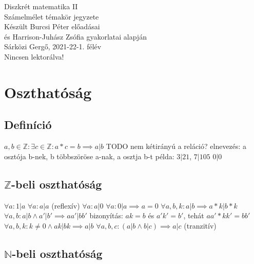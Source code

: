 \documentclass[12pt,a4paper]{article}
\begin{document}
\begin{center}
	\huge
	Diszkrét matematika II\\
	\vspace{1mm}
	\LARGE
	Számelmélet témakör jegyzete\\
	\vspace{5mm}
	\large
	Készült Burcsi Péter előadásai\\
	és Harrison-Juhász Zsófia gyakorlatai alapján\\
	\vspace{5mm}
	Sárközi Gergő, 2021-22-1. félév\\
	Nincsen lektorálva!
\end{center}

\tableofcontents

\pagebreak

\section{Oszthatóság}

\subsection{Definíció}

\begin{outline}
	\1 $a,b \in \mathbb{Z}: \exists c \in \mathbb{Z}: a*c=b \implies a|b$
		\2 TODO nem kétirányú a reláció?
	\1 elnevezés: a osztója b-nek, b többszöröse a-nak, a osztja b-t
	\1 példa: $3|21$, $7|105$
	\1 $0|0$
\end{outline}

\subsection{$\mathbb{Z}$-beli oszthatóság}

\begin{outline}
	\1 $\forall a: 1|a$
	\1 $\forall a: a|a$ (reflexív)
	\1 $\forall a: a|0$
	\1 $\forall a: 0|a \implies a=0$
	\1 $\forall a,b,k: a|b \implies a*k|b*k$
	\1 $\forall a,b: a|b \wedge a'|b' \implies aa'|bb'$
	\2 bizonyítás: $ak=b$ és $a'k'=b'$, tehát $aa'*kk'=bb'$
	\1 $\forall a,b,k: k \ne 0 \wedge ak|bk \implies a|b$
	\1 $\forall a,b,c: (a|b \wedge b|c) \implies a|c$ (tranzitív)
\end{outline}

\subsection{$\mathbb{N}$-beli oszthatóság}
\end{document}
